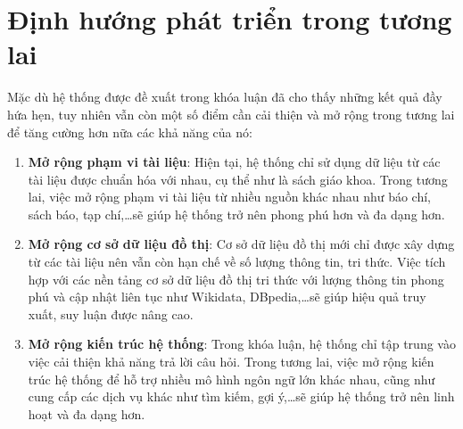 \section{Định hướng phát triển trong tương lai}
\label{sec:futurework}
Mặc dù hệ thống được đề xuất trong khóa luận đã cho thấy những kết quả đầy hứa hẹn, tuy nhiên vẫn còn một số điểm cần cải thiện và mở rộng trong tương lai để tăng cường hơn nữa các khả năng của nó:
\begin{enumerate}
    \item \textbf{Mở rộng phạm vi tài liệu}: Hiện tại, hệ thống chỉ sử dụng dữ liệu từ các tài liệu được chuẩn hóa với nhau, cụ thể như là sách giáo khoa. Trong tương lai, việc mở rộng phạm vi tài liệu từ nhiều nguồn khác nhau như báo chí, sách báo, tạp chí,\dots sẽ giúp hệ thống trở nên phong phú hơn và đa dạng hơn.
    \item \textbf{Mở rộng cơ sở dữ liệu đồ thị}: Cơ sở dữ liệu đồ thị mới chỉ được xây dựng từ các tài liệu nên vẫn còn hạn chế về số lượng thông tin, tri thức. Việc tích hợp với các nền tảng cơ sở dữ liệu đồ thị tri thức với lượng thông tin phong phú và cập nhật liên tục như Wikidata, DBpedia,\dots  sẽ giúp hiệu quả truy xuất, suy luận được nâng cao.
    \item \textbf{Mở rộng kiến trúc hệ thống}: Trong khóa luận, hệ thống chỉ tập trung vào việc cải thiện khả năng trả lời câu hỏi. Trong tương lai, việc mở rộng kiến trúc hệ thống để hỗ trợ nhiều mô hình ngôn ngữ lớn khác nhau, cũng như cung cấp các dịch vụ khác như tìm kiếm, gợi ý,\dots sẽ giúp hệ thống trở nên linh hoạt và đa dạng hơn.
\end{enumerate}

